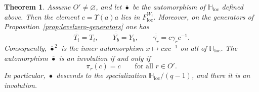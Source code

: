 \documentclass{amsart}
\newtheorem{Thm}{Theorem}[section]
\theoremstyle{definition}
\numberwithin{equation}{section}
\begin{document}
\begin{Thm}\label{thm:levelzero-q1-involution}
Assume $O'\neq\varnothing$, and let $\overline{\bullet}$ be the automorphism of $\mathbb H_{\mathrm{loc}}$ defined above. Then the element \(c=\Upsilon(a)a\) lies in $F_{\mathrm{loc}}^{W_{\mathrm f}}$. Moreover, on the generators of Proposition~\ref{prop:levelzero-generators} one has
\[
\overline{\overline{T_i}}=T_i,
\qquad
\overline{\overline{Y_b}}=Y_b,
\qquad
\overline{\overline{\gamma_r}}=c\gamma_r c^{-1}.
\]
Consequently, $\overline{\bullet}^{\,2}$ is the inner automorphism \(x\mapsto cxc^{-1}\) on all of $\mathbb H_{\mathrm{loc}}$. The automorphism $\overline{\bullet}$ is an involution if and only if
\[
\pi_r(c)=c\qquad\text{for all }r\in O'.
\]
In particular, \(\overline{\bullet}\) descends to the specialization
\(\mathbb H_{\mathrm{loc}}/(q-1)\), and there it is an involution.
\end{Thm}
\end{document}
